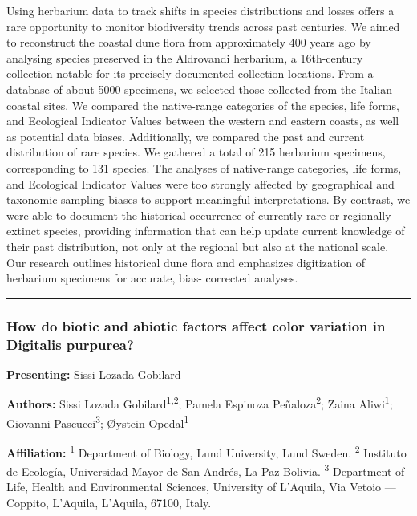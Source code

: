 \documentclass[
  letterpaper,
  DIV=11,
  numbers=noendperiod]{scrartcl}
\begin{document}
Using herbarium data to track shifts in species distributions and losses
offers a rare opportunity to monitor biodiversity trends across past
centuries. We aimed to reconstruct the coastal dune flora from
approximately 400 years ago by analysing species preserved in the
Aldrovandi herbarium, a 16th-century collection notable for its
precisely documented collection locations. From a database of about 5000
specimens, we selected those collected from the Italian coastal sites.
We compared the native-range categories of the species, life forms, and
Ecological Indicator Values between the western and eastern coasts, as
well as potential data biases. Additionally, we compared the past and
current distribution of rare species. We gathered a total of 215
herbarium specimens, corresponding to 131 species. The analyses of
native-range categories, life forms, and Ecological Indicator Values
were too strongly affected by geographical and taxonomic sampling biases
to support meaningful interpretations. By contrast, we were able to
document the historical occurrence of currently rare or regionally
extinct species, providing information that can help update current
knowledge of their past distribution, not only at the regional but also
at the national scale. Our research outlines historical dune flora and
emphasizes digitization of herbarium specimens for accurate, bias-
corrected analyses.

\begin{center}\rule{0.5\linewidth}{0.5pt}\end{center}

\subsubsection{How do biotic and abiotic factors affect color variation
in Digitalis
purpurea?}\label{how-do-biotic-and-abiotic-factors-affect-color-variation-in-digitalis-purpurea}

\textbf{Presenting:} Sissi Lozada Gobilard

\textbf{Authors:} Sissi Lozada Gobilard\textsuperscript{1,2}; Pamela
Espinoza Peñaloza\textsuperscript{2}; Zaina Aliwi\textsuperscript{1};
Giovanni Pascucci\textsuperscript{3}; Øystein Opedal\textsuperscript{1}

\textbf{Affiliation:} \textsuperscript{1} Department of Biology, Lund
University, Lund Sweden. \textsuperscript{2} Instituto de Ecología,
Universidad Mayor de San Andrés, La Paz Bolivia. \textsuperscript{3}
Department of Life, Health and Environmental Sciences, University of
L'Aquila, Via Vetoio --- Coppito, L'Aquila, L'Aquila, 67100, Italy.
\end{document}
